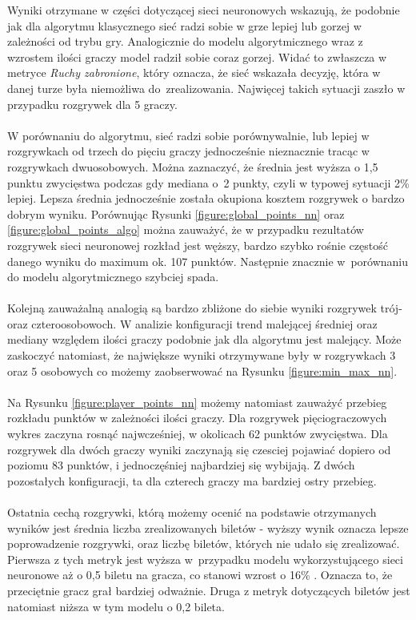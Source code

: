 \documentclass[12pt, oneside]{report}
\begin{document}
	Wyniki otrzymane w części dotyczącej sieci neuronowych wskazują, że podobnie jak dla algorytmu klasycznego sieć radzi sobie w grze lepiej lub gorzej w zależności od trybu gry. Analogicznie do modelu algorytmicznego wraz z wzrostem ilości graczy model radził sobie coraz gorzej. Widać to zwłaszcza w metryce \textit{Ruchy zabronione}, który oznacza, że sieć wskazała decyzję, która w danej turze była niemożliwa do~zrealizowania. Najwięcej takich sytuacji zaszło w przypadku rozgrywek dla 5 graczy. \\ \\
	W porównaniu do algorytmu, sieć radzi sobie porównywalnie, lub lepiej w rozgrywkach od trzech do pięciu graczy jednocześnie nieznacznie tracąc w rozgrywkach dwuosobowych. Można zaznaczyć, że średnia jest wyższa o 1,5 punktu zwycięstwa podczas gdy mediana o~2 punkty, czyli w typowej sytuacji 2\% lepiej. Lepsza średnia jednocześnie została okupiona kosztem rozgrywek o bardzo dobrym wyniku. Porównując Rysunki \ref{figure:global_points_nn} oraz \ref{figure:global_points_algo} można zauważyć, że w przypadku rezultatów rozgrywek sieci neuronowej rozkład jest węższy, bardzo szybko rośnie częstość danego wyniku do maximum ok. 107 punktów. Następnie znacznie w~porównaniu do modelu algorytmicznego szybciej spada. \\ \\
	Kolejną zauważalną analogią są bardzo zbliżone do siebie wyniki rozgrywek trój- oraz czteroosobowoch. W analizie konfiguracji trend malejącej średniej oraz mediany względem ilości graczy podobnie jak dla algorytmu jest malejący. Może zaskoczyć natomiast, że największe wyniki otrzymywane były w rozgrywkach 3 oraz 5 osobowych co możemy zaobserwować na Rysunku \ref{figure:min_max_nn}. \\ \\
	Na Rysunku \ref{figure:player_points_nn} możemy natomiast zauważyć przebieg rozkładu punktów w zależności ilości graczy. Dla rozgrywek pięciograczowych wykres zaczyna rosnąć najwcześniej, w okolicach 62 punktów zwycięstwa. Dla rozgrywek dla dwóch graczy wyniki zaczynają się czesciej pojawiać dopiero od poziomu 83 punktów, i jednoczęśniej najbardziej się wybijają. Z dwóch pozostałych konfiguracji, ta dla czterech graczy ma bardziej ostry przebieg. \\ \\
	Ostatnia cechą rozgrywki, którą możemy ocenić na podstawie otrzymanych wyników jest średnia liczba zrealizowanych biletów - wyższy wynik oznacza lepsze poprowadzenie rozgrywki, oraz liczbę biletów, których nie udało się zrealizować. Pierwsza z tych metryk jest wyższa w~przypadku modelu wykorzystującego sieci neuronowe aż o 0,5 biletu na gracza, co stanowi wzrost o 16\% . Oznacza to, że przeciętnie gracz grał bardziej odważnie. Druga z metryk dotyczących biletów jest natomiast niższa w tym modelu o 0,2 bileta. 
\end{document}
